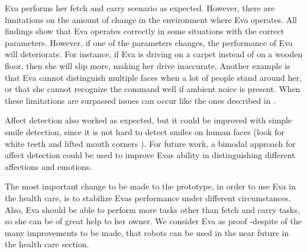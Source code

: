 \documentclass[project_eva.tex]{subfiles}
\begin{document}
Eva performs her fetch and carry scenario as expected. However, there are limitations on the amount of change in the environment where Eva operates. All findings show that Eva operates correctly in some situations with the correct parameters. However, if one of the parameters changes, the performance of Eva will deteriorate. For instance, if Eva is driving on a carpet instead of on a wooden floor, then she will slip more, making her drive inaccurate. Another example is that Eva cannot distinguish multiple faces when a lot of people stand around her, or that she cannot recognize the command well if ambient noice is present. When these limitations are surpassed issues can occur like the ones described in \pageref{simulation} . 

Affect detection also worked as expected, but it could be improved with simple smile detection, since it is not hard to detect smiles on human faces (look for white teeth and lifted mouth corners \cite{autosmiley} ).  For future work, a bimodal approach \cite{bimodal}  for affect detection could be used to improve Eva\textquotesingle s ability in distinguishing different affections and emotions.

The most important change to be made to the prototype, in order to use Eva in the health care, is to stabilize Eva\textquotesingle s performance under different circumstances. Also, Eva should be able to perform more tasks other than fetch and carry tasks, so she can be of great help to her owner. We consider Eva as proof -despite of the many improvements to be made, that robots can be used in the near future in the health care section.
\end{document}
